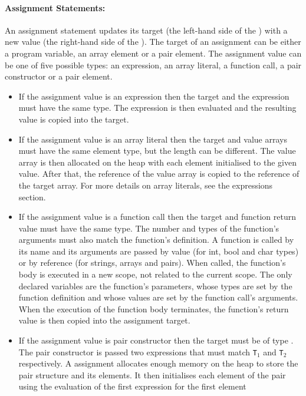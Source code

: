 \documentclass[a4paper]{article}
\theoremstyle{definition}
\begin{document}
\paragraph{Assignment Statements:}
An assignment statement updates its target (the left-hand side of the \lit{=}) with a new value (the right-hand side of the \lit{=}).
The target of an assignment can be either a program variable, an array element or a pair element.
The assignment value can be one of five possible types: an expression, an array literal, a function call, a pair constructor or a pair element.
\begin{itemize}
 \item If the assignment value is an expression  then 
       the target and the expression must have the same type.
       The expression is then evaluated and the resulting value is copied into the target.
 \item If the assignment value is an array literal  then the target and value arrays must have the same element type, 
       but the length can be different. 
       The value array is then allocated on the heap with each element initialised to the given value. After that, the reference of the value array is copied to the reference of the target array.
       For more details on array literals, see the expressions section.
 \item If the assignment value is a function call  then the target and function return value must have the same type. 
       The number and types of the function's arguments must also match the function's definition.
       A function is called by its name and its arguments are passed by value (for int, bool and char types) or by reference (for strings, arrays and pairs).
       When called, the function's body is executed in a new scope, not related to the current scope.
       The only declared variables are the function's parameters, whose types are set by the function definition and whose values are set by the function call's arguments.
       When the execution of the function body terminates, the function's return value is then copied into the assignment target.
 \item If the assignment value is pair constructor  then the target must be of type .
       The pair constructor is passed two expressions that must match {\tt T}$_1$ and {\tt T}$_2$ respectively.
       A  assignment allocates enough memory on the heap to store the pair structure and its elements.
       It then initialises each element of the pair using the evaluation of the first expression for the first element 

\end{itemize}
\end{document}
